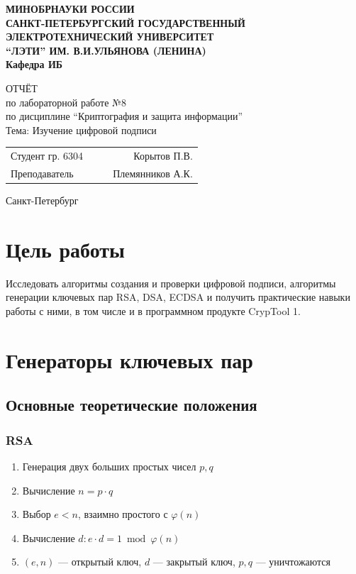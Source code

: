 \documentclass[a4paper, 14pt]{extarticle}
\begin{document}
\begin{titlepage}
    \centering
    {\bfseries
        \uppercase{
            Минобрнауки России \\
            Санкт-Петербургский государственный \\
            Электротехнический университет \\
            \enquote{ЛЭТИ} им. В.И.Ульянова (Ленина)\\
        }
        Кафедра ИБ

        \vspace{\fill}
        \uppercase{Отчёт} \\
        по лабораторной работе №8 \\
        по дисциплине \enquote{Криптография и защита информации} \\
        Тема: Изучение цифровой подписи
    }

    \vspace{\fill}
    \begin{tabularx}{0.8\textwidth}{l X c r}
        Студент гр. 6304 & & \underline{\hspace{3cm}} & Корытов П.В.\\
        Преподаватель & & \underline{\hspace{3cm}} & Племянников А.К.
    \end{tabularx}

    \vspace{1cm}
    Санкт-Петербург \\
    \the\year{}
\end{titlepage}
\section*{Цель работы}
Исследовать алгоритмы создания и проверки цифровой подписи, алгоритмы генерации ключевых пар RSA, DSA, ECDSA и получить практические навыки работы с ними, в том числе и в программном продукте CrypTool 1.

\section{Генераторы ключевых пар}
\subsection{Основные теоретические положения}
\subsubsection{RSA}
\begin{enumerate}
    \item Генерация двух больших простых чисел $p, q$
    \item Вычисление $n = p \cdot q$
    \item Выбор $e < n$, взаимно простого с $\varphi(n)$
    \item Вычисление $d : e \cdot d = 1 \bmod \varphi(n)$
    \item $(e, n)$ --- открытый ключ, $d$ --- закрытый ключ, $p, q$ --- уничтожаются
\end{enumerate}
\end{document}
